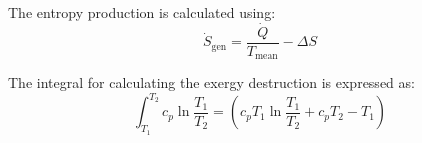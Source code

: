 The entropy production is calculated using:  
\[
\dot{S}_{\text{gen}} = \frac{\dot{Q}}{T_{\text{mean}}} - \Delta S
\]

The integral for calculating the exergy destruction is expressed as:  
\[
\int_{T_1}^{T_2} c_p \ln \frac{T_1}{T_2} = (c_p T_1 \ln \frac{T_1}{T_2} + c_p T_2 - T_1)
\]